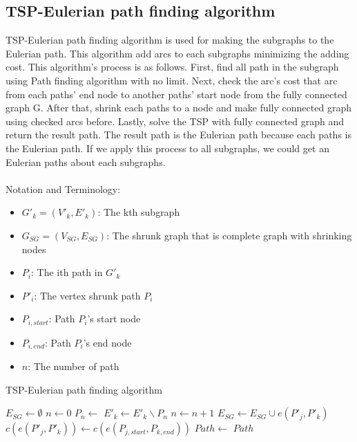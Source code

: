 \documentclass{article}
\begin{document}
\subsection{TSP-Eulerian path finding algorithm}
TSP-Eulerian path finding algorithm is used for making the subgraphs to the Eulerian path. This algorithm add arcs to each subgraphs minimizing the adding cost. This algorithm's process is as follows. First, find all path in the subgraph using Path finding algorithm with no limit. Next, check the arc's cost that arc from each paths' end node to another paths' start node from the fully connected graph G. After that, shrink each paths to a node and make fully connected graph using checked arcs before. Lastly, solve the TSP with fully connected graph and return the result path. The result path is the Eulerian path because each paths is the Eulerian path. If we apply this process to all subgraphs, we could get an Eulerian paths about each subgraphs.
\\
\\ Notation and Terminology:
\begin{itemize}
    \item $G'_k=(V'_k,E'_k)$: The kth subgraph
    \item $G_{SG}=(V_{SG},E_{SG})$: The shrunk graph that is complete graph with shrinking nodes
    \item $P_i$: The ith path in $G'_k$
    \item $P'_i$: The vertex shrunk path $P_i$
    \item $P_{i,start}$: Path $P_i$'s start node
    \item $P_{i,end}$: Path $P_i$'s end node
    \item $n$: The number of path
\end{itemize}

\begin{algorithm}[H]
    \caption{TSP-Eulerian path finding algorithm}
    \begin{algorithmic}[1]
    
        \State $E_{SG} \leftarrow \emptyset$
        \State $n \leftarrow 0$
            \State $P_{n} \leftarrow$  
            \State $E'_k \leftarrow E'_k \backslash P_{n}$ 
            \State ${n} \leftarrow n+1$
        \EndWhile
                    \State $E_{SG} \leftarrow E_{SG} \cup e(P'_j,P'_k)$
                    \State $c(e(P'_j,P'_k)) \leftarrow c(e(P_{j,start},P_{k,end}))$ 
                \EndIf
            \EndFor
        \EndFor
        \State $Path \leftarrow$  
        \State \Return $Path$
    \end{algorithmic}
\end{algorithm}
\end{document}

